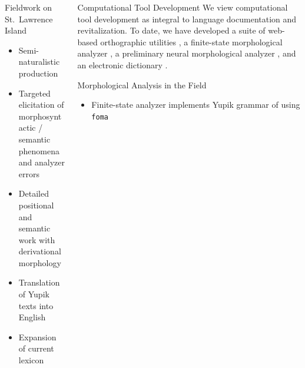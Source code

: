\documentclass[usenames,dvipsnames]{beamer}
\begin{document}
\begin{frame}[fragile]
\begin{columns}[T]
\begin{column}{0.3\textwidth}
\begin{block}{Fieldwork on St.~Lawrence Island}

\begin{itemize}
 \setlength\itemsep{18pt}
        \item Semi-naturalistic production
        
        \item Targeted elicitation of morphosyntactic / semantic phenomena and analyzer errors
        
        \item Detailed positional and semantic work with derivational morphology
        
        \item Translation of Yupik texts into English
        
        \item Expansion of current lexicon

    \end{itemize}
    \vspace*{3mm}
\end{block}

\end{column}

\begin{column}{0.29\textwidth}
\begin{block}{Computational Tool Development}
%
We view computational tool development as integral to language documentation and revitalization.
%
%
To date, we have developed a suite of web-based orthographic utilities \citep{SchwartzChen:2017}, a finite-state morphological analyzer \citep{ChenSchwartz:LREC:2018}, a preliminary neural morphological analyzer \citep{Schwartz:etal:ComputEL:2019}, and an electronic  dictionary \citep{Hunt:etal:ICLDC:2019}.
%
\end{block}

\begin{block}{Morphological Analysis in the Field}

\begin{itemize}
    \item Finite-state analyzer implements Yupik grammar of \citet{Jacobson:2001} using \texttt{foma} \citep{Hulden:2009} 


\end{itemize}
\end{block}
\end{column}
\end{columns}
\end{frame}
\end{document}
